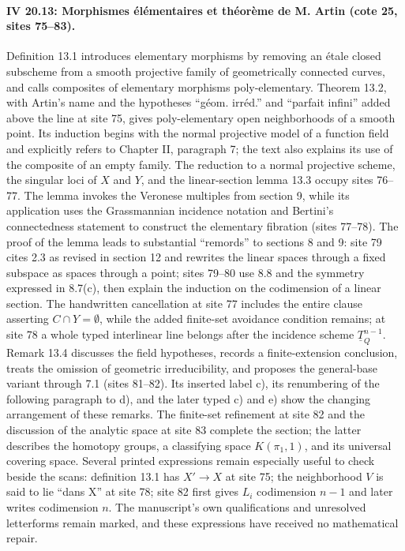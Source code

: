 \documentclass[10pt,a4paper]{article}
\begin{document}
\par{}
\paragraph{IV 20.13: Morphismes élémentaires et théorème de M. Artin (cote 25, sites 75--83).}
Definition 13.1 introduces elementary morphisms by removing an étale closed subscheme from a smooth projective family of geometrically connected curves, and calls composites of elementary morphisms poly-elementary. Theorem 13.2, with Artin's name and the hypotheses ``géom. irréd.'' and ``parfait infini'' added above the line at site 75, gives poly-elementary open neighborhoods of a smooth point. Its induction begins with the normal projective model of a function field and explicitly refers to Chapter II, paragraph 7; the text also explains its use of the composite of an empty family. The reduction to a normal projective scheme, the singular loci of $X$ and $Y$, and the linear-section lemma 13.3 occupy sites 76--77. The lemma invokes the Veronese multiples from section 9, while its application uses the Grassmannian incidence notation and Bertini's connectedness statement to construct the elementary fibration (sites 77--78). The proof of the lemma leads to substantial ``remords'' to sections 8 and 9: site 79 cites 2.3 as revised in section 12 and rewrites the linear spaces through a fixed subspace as spaces through a point; sites 79--80 use 8.8 and the symmetry expressed in 8.7(c), then explain the induction on the codimension of a linear section. The handwritten cancellation at site 77 includes the entire clause asserting $C\cap Y=\emptyset$, while the added finite-set avoidance condition remains; at site 78 a whole typed interlinear line belongs after the incidence scheme $\underline{T}^{n-1}_Q$. Remark 13.4 discusses the field hypotheses, records a finite-extension conclusion, treats the omission of geometric irreducibility, and proposes the general-base variant through 7.1 (sites 81--82). Its inserted label c), its renumbering of the following paragraph to d), and the later typed c) and e) show the changing arrangement of these remarks. The finite-set refinement at site 82 and the discussion of the analytic space at site 83 complete the section; the latter describes the homotopy groups, a classifying space $K(\pi_1,1)$, and its universal covering space. Several printed expressions remain especially useful to check beside the scans: definition 13.1 has $X'\to X$ at site 75; the neighborhood $V$ is said to lie ``dans X'' at site 78; site 82 first gives $L_i$ codimension $n-1$ and later writes codimension $n$. The manuscript's own qualifications and unresolved letterforms remain marked, and these expressions have received no mathematical repair.
\par{}
\end{document}

